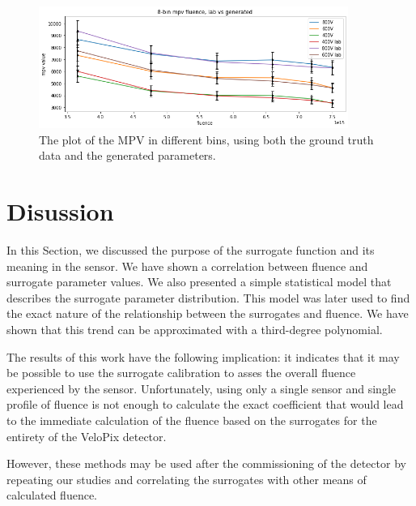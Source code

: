 \begin{figure}[H]
\centering
\includegraphics[width=0.9\textwidth]{figures/chapter4/surrogates/mpv_vs_fluence.png}
\caption{The plot of the MPV in different bins, using both the ground truth data and the generated parameters.}
\label{fig:mpv_vs_fluence}
\end{figure}

\section{Disussion}
In this Section, we discussed the purpose of the surrogate function and its meaning in the sensor.
We have shown a correlation between fluence and surrogate parameter values.
We also presented a simple statistical model that describes the surrogate parameter distribution. This model was later used to find the exact nature of the relationship between the surrogates and fluence.
We have shown that this trend can be approximated with a third-degree polynomial.

The results of this work have the following implication: it indicates that it may be possible to use the surrogate calibration to asses the overall fluence experienced by the sensor.
Unfortunately, using only a single sensor and single profile of fluence is not enough to calculate the exact coefficient that would lead to the immediate calculation of the fluence based on the surrogates for the entirety of the VeloPix detector.

However, these methods may be used after the commissioning of the detector by repeating our studies and correlating the surrogates with other means of calculated fluence.


